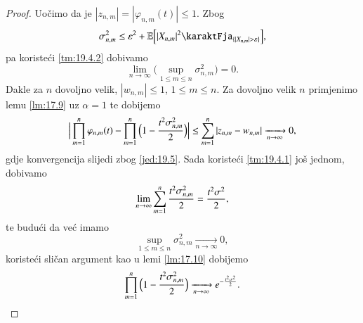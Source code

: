 \begin{proof}
    Uo\v cimo da je $|z_{n, m}| = |\varphi_{n, m} (t)| \leq 1$.
    Zbog
    \begin{equation*}
        \sigma_{n, m}^2 \leq \varepsilon^2 + \masE \Big[ |X_{n, m}|^2 \karaktFja_{\{ |X_{n, m}| > \varepsilon \}} \Big],    
    \end{equation*}
    pa koriste\' ci \ref{tm:19.4.2} dobivamo
    \begin{equation*}
        \lim\limits_{n \to \infty} \big( \sup\limits_{1 \leq m \leq n} \sigma_{n, m}^2 \big) = 0.
    \end{equation*}
    Dakle za $n$ dovoljno velik, $|w_{n, m}| \leq 1$, $1 \leq m \leq n$.
    Za dovoljno velik $n$ primjenimo lemu \ref{lm:17.9} uz $\alpha = 1$ te dobijemo
    \begin{equation*}
        \Big| \prod\limits_{m = 1}^{n} \varphi_{n, m} (t) - \prod\limits_{m = 1}^{n} \Big( 1 - \frac{t^2 \sigma_{n, m}^2}{2} \Big) \Big| \leq \sum\limits_{m = 1}^{n} |z_{n, m} - w_{n, m}| \xrightarrow[n \to \infty]{} 0,
    \end{equation*}
    gdje konvergencija slijedi zbog \eqref{jed:19.5}.
    Sada koriste\' ci \ref{tm:19.4.1} jo\v s jednom, dobivamo
    \begin{equation*}
        \lim\limits_{n \to \infty} \sum\limits_{m = 1}^{n} \frac{t^2 \sigma_{n, m}^2}{2} = \frac{t^2 \sigma^2}{2},
    \end{equation*}
    te budu\' ci da ve\' c imamo
    \begin{equation*}
        \sup\limits_{1 \leq m \leq n} \sigma_{n, m}^2 \xrightarrow[n \to \infty]{} 0,    
    \end{equation*}
    koriste\' ci sli\v can argument kao u lemi \ref{lm:17.10} dobijemo
    \begin{equation*}
        \prod\limits_{m = 1}^{n} \Big( 1 - \frac{t^2 \sigma_{n, m}^2}{2} \Big) \xrightarrow[n \to \infty]{} e^{- \frac{t^2 \sigma^2}{2}}.
    \end{equation*}
\end{proof}

